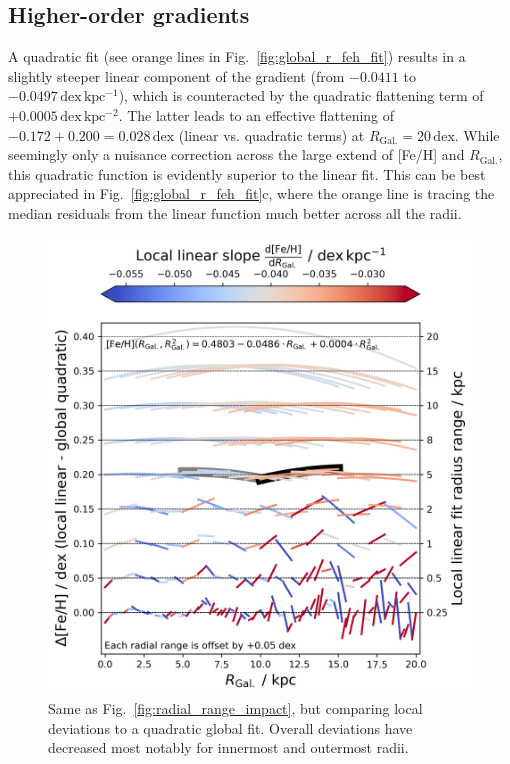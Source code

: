 \documentclass[fleqn,usenatbib]{mnras}
\begin{document}
\subsection{Higher-order gradients} \label{sec:non-linear_component}

A quadratic fit (see orange lines in Fig.~\ref{fig:global_r_feh_fit}) results in a slightly steeper linear component of the gradient (from $-0.0411$ to $-0.0497\,\mathrm{dex\,kpc^{-1}}$), which is counteracted by the quadratic flattening term of $+0.0005\,\mathrm{dex\,kpc^{-2}}$. The latter leads to an effective flattening of $-0.172 + 0.200 = 0.028\,\mathrm{dex}$ (linear vs. quadratic terms) at $R_\mathrm{Gal.} = 20\,\mathrm{dex}$. While seemingly only a nuisance correction across the large extend of [Fe/H] and $R_\mathrm{Gal.}$, this quadratic function is evidently superior to the linear fit. This can be best appreciated in Fig.~\ref{fig:global_r_feh_fit}c, where the orange line is tracing the median residuals from the linear function much better across all the radii.

\begin{figure}
    \centering
    \includegraphics[width=\columnwidth]{figures/radial_range_impact_quadratic.png}
    \caption{Same as Fig.~\ref{fig:radial_range_impact}, but comparing local deviations to a quadratic global fit. Overall deviations have decreased most notably for innermost and outermost radii.}
    \label{fig:radial_range_impact_quadratic}
\end{figure}
\end{document}
